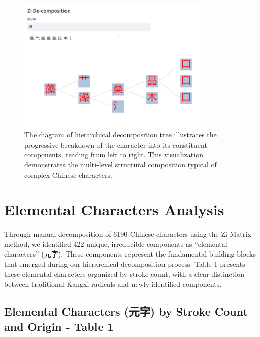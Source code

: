 \documentclass[11pt,letterpaper]{article}
\begin{document}
\begin{figure}
\centering
\includegraphics[width=0.85\textwidth]{./images/app_decomposing-zi.png}
\caption{The diagram of hierarchical decomposition tree illustrates the
progressive breakdown of the character into its constituent components,
reading from left to right. This visualization demonstrates the
multi-level structural composition typical of complex Chinese
characters.}
\end{figure}

\section{Elemental Characters Analysis}\label{elemental-characters-analysis}

Through manual decomposition of 6190 Chinese characters using the
Zi-Matrix method, we identified 422 unique, irreducible components as
``elemental characters'' (元字). These components represent the
fundamental building blocks that emerged during our hierarchical
decomposition process. Table 1 presents these elemental characters
organized by stroke count, with a clear distinction between traditional
Kangxi radicals and newly identified components.

\subsection{Elemental Characters (元字) by Stroke Count and Origin -
Table
1}\label{elemental-characters-ux5143ux5b57-by-stroke-count-and-origin---table-1}
\end{document}
